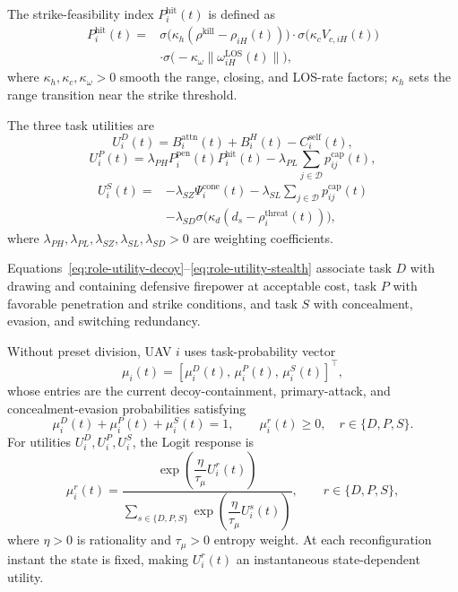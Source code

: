 \documentclass{cja}
\begin{document}
The strike-feasibility index $P_i^{\mathrm{hit}}(t)$ is defined as
\begin{equation}
\begin{aligned}
P_i^{\mathrm{hit}}(t)
={}&
\sigma\!\bigl(\kappa_h(\rho^{\mathrm{kill}}-\rho_{iH}(t))\bigr)
\cdot
\sigma\!\bigl(\kappa_c V_{c,iH}(t)\bigr)\\
&\cdot
\sigma\!\bigl(-\kappa_{\omega}\|\omega_{iH}^{\mathrm{LOS}}(t)\|\bigr),
\end{aligned}
\label{eq:P_hit_def}
\end{equation}
where $\kappa_h,\kappa_c,\kappa_{\omega}>0$ smooth the range, closing, and LOS-rate factors; $\kappa_h$ sets the range transition near the strike threshold.

The three task utilities are
\begin{equation}
U_i^{D}(t)
=B_i^{\mathrm{attn}}(t)+B_i^{H}(t)-C_i^{\mathrm{self}}(t),
\label{eq:role-utility-decoy}
\end{equation}
\begin{equation}
U_i^{P}(t)
=\lambda_{PH}P_i^{\mathrm{pen}}(t)P_i^{\mathrm{hit}}(t)
-\lambda_{PL}\sum_{j\in\mathcal D}p_{ij}^{\mathrm{cap}}(t),
\label{eq:role-utility-pen}
\end{equation}
\begin{equation}
\begin{aligned}
U_i^{S}(t)
={}&-\lambda_{SZ}\Psi_i^{\mathrm{cone}}(t)
-\lambda_{SL}\sum_{j\in\mathcal D}p_{ij}^{\mathrm{cap}}(t)\\
&-\lambda_{SD}\sigma\!\bigl(\kappa_d(d_s-\rho_i^{\mathrm{threat}}(t))\bigr),
\end{aligned}
\label{eq:role-utility-stealth}
\end{equation}
where $\lambda_{PH},\lambda_{PL},\lambda_{SZ},\lambda_{SL},\lambda_{SD}>0$ are weighting coefficients.

Equations~\eqref{eq:role-utility-decoy}--\eqref{eq:role-utility-stealth} associate task $D$ with drawing and containing defensive firepower at acceptable cost, task $P$ with favorable penetration and strike conditions, and task $S$ with concealment, evasion, and switching redundancy.

Without preset division, UAV $i$ uses task-probability vector
\begin{equation}
\mu_i(t)=
\left[
\mu_i^{D}(t),\,
\mu_i^{P}(t),\,
\mu_i^{S}(t)
\right]^{\top},
\end{equation}
whose entries are the current decoy-containment, primary-attack, and concealment-evasion probabilities satisfying
\begin{equation}
\mu_i^{D}(t)+\mu_i^{P}(t)+\mu_i^{S}(t)=1,\qquad
\mu_i^{r}(t)\ge 0,\quad r\in\{D,P,S\}.
\end{equation}
For utilities $U_i^{D},U_i^{P},U_i^{S}$, the Logit response is
\begin{equation}
\mu_i^{r}(t)
=
\frac{\exp\!\left(\dfrac{\eta}{\tau_\mu}U_i^{r}(t)\right)}
{\sum\limits_{s\in\{D,P,S\}}\exp\!\left(\dfrac{\eta}{\tau_\mu}U_i^{s}(t)\right)},
\qquad r\in\{D,P,S\},
\label{eq:role-logit}
\end{equation}
where $\eta>0$ is rationality and $\tau_\mu>0$ entropy weight. At each reconfiguration instant the state is fixed, making $U_i^r(t)$ an instantaneous state-dependent utility.
\end{document}
